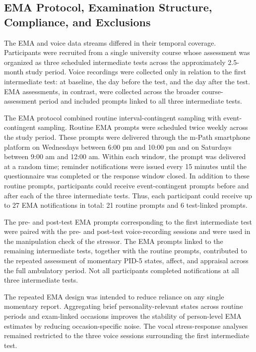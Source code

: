 \documentclass[
  english,
  man,floatsintext]{apa6}
\begin{document}
\subsection{EMA Protocol, Examination Structure, Compliance, and Exclusions}\label{s-ema-protocol}

The EMA and voice data streams differed in their temporal coverage. Participants were recruited from a single university course whose assessment was organized as three scheduled intermediate tests across the approximately 2.5-month study period. Voice recordings were collected only in relation to the first intermediate test: at baseline, the day before the test, and the day after the test. EMA assessments, in contrast, were collected across the broader course-assessment period and included prompts linked to all three intermediate tests.

The EMA protocol combined routine interval-contingent sampling with event-contingent sampling. Routine EMA prompts were scheduled twice weekly across the study period. These prompts were delivered through the m-Path smartphone platform on Wednesdays between 6:00 pm and 10:00 pm and on Saturdays between 9:00 am and 12:00 am. Within each window, the prompt was delivered at a random time; reminder notifications were issued every 15 minutes until the questionnaire was completed or the response window closed. In addition to these routine prompts, participants could receive event-contingent prompts before and after each of the three intermediate tests. Thus, each participant could receive up to 27 EMA notifications in total: 21 routine prompts and 6 test-linked prompts.

The pre- and post-test EMA prompts corresponding to the first intermediate test were paired with the pre- and post-test voice-recording sessions and were used in the manipulation check of the stressor. The EMA prompts linked to the remaining intermediate tests, together with the routine prompts, contributed to the repeated assessment of momentary PID-5 states, affect, and appraisal across the full ambulatory period. Not all participants completed notifications at all three intermediate tests.

The repeated EMA design was intended to reduce reliance on any single momentary report. Aggregating brief personality-relevant states across routine periods and exam-linked occasions improves the stability of person-level EMA estimates by reducing occasion-specific noise. The vocal stress-response analyses remained restricted to the three voice sessions surrounding the first intermediate test.
\end{document}
